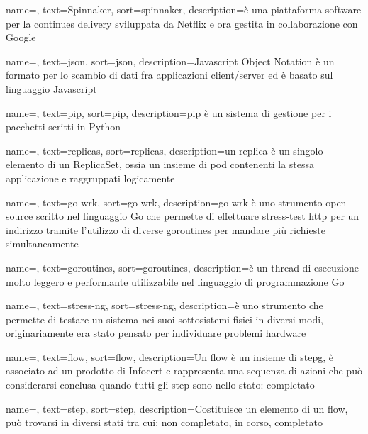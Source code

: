 {
    name=,
    text=Spinnaker,
    sort=spinnaker,
    description={è una piattaforma software per la continues delivery sviluppata da Netflix e ora gestita in collaborazione con Google}
}

{
    name=,
    text=json,
    sort=json,
    description={Javascript Object Notation è un formato per lo scambio di dati fra applicazioni client/server ed è basato sul linguaggio Javascript}
}

{
    name=,
    text=pip,
    sort=pip,
    description={pip è un sistema di gestione per i pacchetti scritti in Python}
}

{
    name=,
    text=replicas,
    sort=replicas,
    description={un replica è un singolo elemento di un ReplicaSet, ossia un insieme di pod contenenti la stessa applicazione e raggruppati logicamente}
}

{
    name=,
    text=go-wrk,
    sort=go-wrk,
    description={go-wrk è uno strumento open-source scritto nel linguaggio Go che permette di effettuare stress-test http per un indirizzo tramite l'utilizzo di diverse goroutines per mandare più richieste simultaneamente}
}

{
    name=,
    text=goroutines,
    sort=goroutines,
    description={è un thread di esecuzione molto leggero e performante utilizzabile nel linguaggio di programmazione Go}
}

{
    name=,
    text=stress-ng,
    sort=stress-ng,
    description={è uno strumento che permette di testare un sistema nei suoi sottosistemi fisici in diversi modi, originariamente era stato pensato per individuare problemi hardware}
}

{
    name=,
    text=flow,
    sort=flow,
    description={Un flow è un insieme di \gls{stepg}, è associato ad un prodotto di Infocert e rappresenta una sequenza di azioni che può considerarsi conclusa quando tutti gli step sono nello stato: completato}
}

{
    name=,
    text=step,
    sort=step,
    description={Costituisce un elemento di un flow, può trovarsi in diversi stati tra cui: non completato, in corso, completato}
}